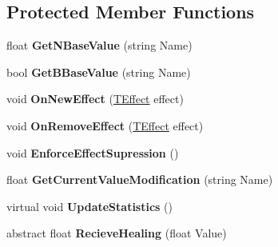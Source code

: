 \subsection*{Protected Member Functions}
\begin{DoxyCompactItemize}
\item 
\hypertarget{class_r_p_g_object_ab05437a7714f58d52ee610f1fb9c052b}{}float {\bfseries Get\+N\+Base\+Value} (string Name)\label{class_r_p_g_object_ab05437a7714f58d52ee610f1fb9c052b}

\item 
\hypertarget{class_r_p_g_object_a7772162c56eed453f9f97b6ac01bc48b}{}bool {\bfseries Get\+B\+Base\+Value} (string Name)\label{class_r_p_g_object_a7772162c56eed453f9f97b6ac01bc48b}

\item 
\hypertarget{class_r_p_g_object_a766f2912c7947d76a429a373b3073ce2}{}void {\bfseries On\+New\+Effect} (\hyperlink{class_t_effect}{T\+Effect} effect)\label{class_r_p_g_object_a766f2912c7947d76a429a373b3073ce2}

\item 
\hypertarget{class_r_p_g_object_a3c97b73354e9eec8e3ad5d85308ba728}{}void {\bfseries On\+Remove\+Effect} (\hyperlink{class_t_effect}{T\+Effect} effect)\label{class_r_p_g_object_a3c97b73354e9eec8e3ad5d85308ba728}

\item 
\hypertarget{class_r_p_g_object_af344332996644a20d6a3b87d8c22b89f}{}void {\bfseries Enforce\+Effect\+Supression} ()\label{class_r_p_g_object_af344332996644a20d6a3b87d8c22b89f}

\item 
\hypertarget{class_r_p_g_object_a4480d28e80d2f5d59c0b831817c74621}{}float {\bfseries Get\+Current\+Value\+Modification} (string Name)\label{class_r_p_g_object_a4480d28e80d2f5d59c0b831817c74621}

\item 
\hypertarget{class_r_p_g_object_a548b39ae1ef3c7084662289fc801101c}{}virtual void {\bfseries Update\+Statistics} ()\label{class_r_p_g_object_a548b39ae1ef3c7084662289fc801101c}

\item 
\hypertarget{class_r_p_g_object_a6b796a1ff13ea340a81690ee81d62848}{}abstract float {\bfseries Recieve\+Healing} (float Value)\label{class_r_p_g_object_a6b796a1ff13ea340a81690ee81d62848}

\end{DoxyCompactItemize}
